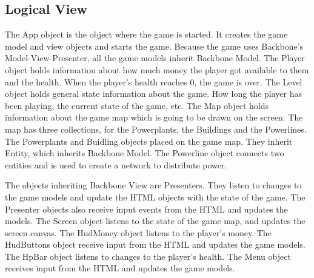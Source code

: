 \subsection*{Logical View}

	The App object is the object where the game is started. It creates the game model and view objects 
	and starts the game. Because the game uses Backbone's Model-View-Presenter, all the game models 
	inherit Backbone Model. The Player object holds information about how much money the player got 
	available to them and the health. When the player's health reaches 0, the game is over. The Level 
	object holds general state information about the game. How long the player has been playing, the 
	current state of the game, etc. The Map object holds information about the game map which is going 
	to be drawn on the screen. The map has three collections, for the Powerplants, the Buildings and 
	the Powerlines. The Powerplants and Buidling objects placed on the game map. They inherit Entity, 
	which inherits Backbone Model. The Powerline object connects two entities and is used to create a
	network to distribute power.

	The objects inheriting Backbone View are Presenters. They listen to changes to the game models and 
	update the HTML objects with the state of the game. The Presenter objects also receive input events
	from the HTML and updates the models. The Screen object listens to the state of the game map, and
	updates the screen canvas. The HudMoney object listens to the player's money. The HudButtons object 
	receive input from the HTML and updates the game models. The HpBar object listens to changes to the 
	player's health. The Menu object receives input from the HTML and updates the game models.

